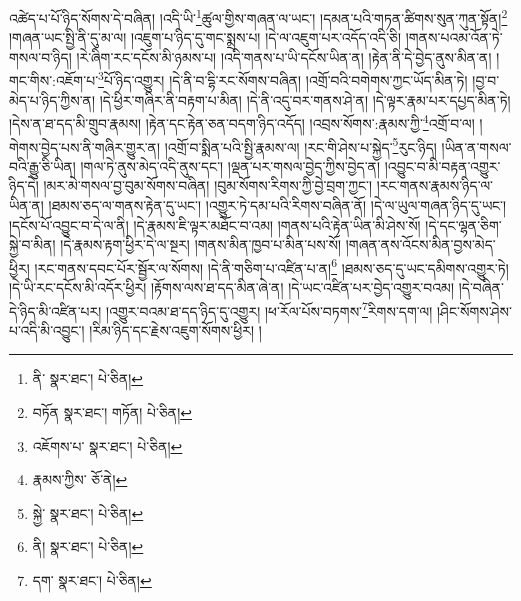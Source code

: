 འཚེད་པ་པོ་ཉིད་སོགས་དེ་བཞིན། །འདི་ཡི་\footnote{ནི་  སྣར་ཐང་།  པེ་ཅིན། }ཚུལ་གྱིས་གཞན་ལ་ཡང་། །དམན་པའི་གཏན་ཚིགས་སུན་ཀུན་སྟོན།\footnote{བཏོན  སྣར་ཐང་། གཏོན།  པེ་ཅིན། } །གཞན་ཡང་སྤྱི་ནི་དུ་མ་ལ། །འཇུག་པ་ཉིད་དུ་གང་སྨྲས་པ། །དེ་ལ་འཇུག་པར་འདོད་འདི་ཅི། །གནས་པའམ་འོན་ཏེ་གསལ་བ་ཉིད། །རེ་ཞིག་རང་དངོས་མི་ཉམས་པ། །འདི་གནས་པ་ཡི་དངོས་ཡིན་ན། །རྟེན་ནི་དེ་བྱེད་ནུས་མིན་ན། །གང་གིས་:འཇོག་པ་\footnote{འཇོགས་པ་  སྣར་ཐང་།  པེ་ཅིན། }པོ་ཉིད་འགྱུར། །དེ་ནི་བ་དྷི་རང་སོགས་བཞིན། །འགྲོ་བའི་བགེགས་ཀྱང་ཡོད་མིན་ཏེ། །བྱ་བ་མེད་པ་ཉིད་ཀྱིས་ན། །དེ་ཕྱིར་གཞིར་ནི་བརྟག་པ་མིན། །དེ་ནི་འདུ་བར་གནས་ཤེ་ན། །དེ་ལྟར་རྣམ་པར་དཔྱད་མིན་ཏེ། །དེས་ན་ཐ་དད་མི་གྲུབ་རྣམས། །རྟེན་དང་རྟེན་ཅན་བདག་ཉིད་འདོད། །འབྲས་སོགས་:རྣམས་ཀྱི་\footnote{རྣམས་ཀྱིས་  ཅོ་ནེ། }འགྲོ་བ་ལ། །གེགས་བྱེད་པས་ནི་གཞིར་གྱུར་ན། །འགྲོ་བ་སྨིན་པའི་སྤྱི་རྣམས་ལ། །རང་གི་ཤེས་པ་སྐྱེད་\footnote{སྐྱེ་  སྣར་ཐང་།  པེ་ཅིན། }རུང་ཉིད། །ཡིན་ན་གསལ་བའི་རྒྱུ་ཅི་ཡིན། །གལ་ཏེ་ནུས་མེད་འདི་ནུས་དང་། །ལྡན་པར་གསལ་བྱེད་ཀྱིས་བྱེད་ན། །འབྱུང་བ་མི་བརྟན་འགྱུར་ཉིད་དེ། །མར་མེ་གསལ་བྱ་བུམ་སོགས་བཞིན། །བུམ་སོགས་རིགས་ཀྱི་བྱེ་བྲག་ཀྱང་། །རང་གནས་རྣམས་ཉིད་ལ་ཡིན་ན། །ཐམས་ཅད་ལ་གནས་རྟེན་དུ་ཡང་། །འགྱུར་ཏེ་དམ་པའི་རིགས་བཞིན་ནོ། །དེ་ལ་ཡུལ་གཞན་ཉིད་དུ་ཡང་། །དངོས་པོ་འབྱུང་བ་དེ་ལ་ནི། །དེ་རྣམས་ཇི་ལྟར་མཐོང་བ་འམ། །གནས་པའི་རྟེན་ཡིན་མི་ཤེས་སོ། །དེ་དང་ལྷན་ཅིག་སྐྱེ་བ་མིན། །དེ་རྣམས་རྟག་ཕྱིར་དེ་ལ་སྔར། །གནས་མིན་ཁྱབ་པ་མིན་པས་སོ། །གཞན་ནས་འོངས་མིན་བྱས་མེད་ཕྱིར། །རང་གནས་དབང་པོར་སྦྱོར་ལ་སོགས། །དེ་ནི་གཅིག་པ་འཛིན་པ་ན།\footnote{ནི།  སྣར་ཐང་།  པེ་ཅིན། } །ཐམས་ཅད་དུ་ཡང་དམིགས་འགྱུར་ཏེ། །དེ་ཡི་རང་དངོས་མི་འདོར་ཕྱིར། །རྟོགས་ལས་ཐ་དད་མིན་ཞེ་ན། །དེ་ཡང་འཛིན་པར་བྱེད་འགྱུར་བའམ། །དེ་བཞིན་དེ་ཉིད་མི་འཛིན་པར། །འགྱུར་བའམ་ཐ་དད་ཉིད་དུ་འགྱུར། །ཕ་རོལ་པོས་བཏགས་\footnote{དག་  སྣར་ཐང་།  པེ་ཅིན། }རིགས་དག་ལ། །ཤིང་སོགས་ཤེས་པ་འདི་མི་འབྱུང་། །རིམ་ཉིད་དང་རྗེས་འཇུག་སོགས་ཕྱིར། །
